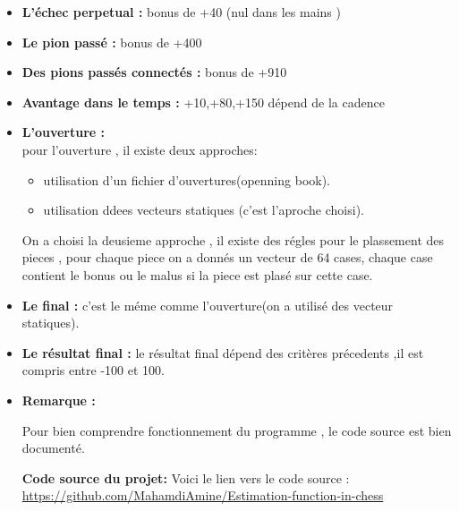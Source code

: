\documentclass[12pt]{report}
\begin{document}
\begin{itemize}
	\item \textbf{L'échec perpetual :} bonus de +40 (nul dans les mains )\\
	\item \textbf{Le pion passé :} bonus de +400\\
	\item \textbf{Des pions passés connectés :} bonus de +910 \\
	\item \textbf{Avantage dans le temps :} {+10,+80,+150} dépend de la cadence\\
	\item \textbf{L'ouverture :} \\
	pour l'ouverture , il existe deux approches:
	\begin{itemize}
		\item utilisation d'un fichier d'ouvertures(openning book).
		\item utilisation ddees vecteurs statiques (c'est l'aproche choisi).
	\end{itemize}
	On a choisi la deusieme approche , il existe des régles pour le plassement des pieces , pour chaque piece on a donnés un vecteur de 64 cases, chaque case contient le bonus ou le malus si la piece est plasé sur cette case.
	\item \textbf{Le final :} c'est le méme comme l'ouverture(on a utilisé des vecteur statiques). \\  
	\item \textbf{Le résultat final :} le résultat final dépend des critères précedents ,il est compris entre -100 et 100.
	 \item \textbf{Remarque :} 
	\par{}
	Pour bien comprendre fonctionnement du programme  , le code source est bien documenté.
	\par{}
	\textbf{Code source du projet: } 
	\newline
	Voici  le lien vers le code source :
	\newline
	\href{https://github.com/MahamdiAmine/Estimation-function-in-chess}{https://github.com/MahamdiAmine/Estimation-function-in-chess}
\end{itemize}
\end{document}
